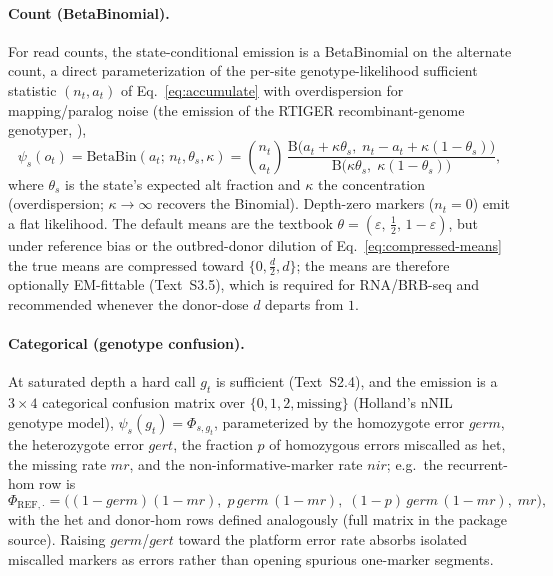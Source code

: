 \documentclass[11pt]{article}
\newcommand{\REF}{\mathrm{REF}}
\newcommand{\BetaBin}{\mathrm{BetaBin}}
\newcommand{\Bfun}{\mathrm{B}}                     %
\begin{document}
\paragraph{Count (BetaBinomial).} For read counts, the state-conditional emission is
a BetaBinomial on the alternate count, a direct parameterization of the per-site
genotype-likelihood sufficient statistic $(n_t,a_t)$ of Eq.~\eqref{eq:accumulate}
with overdispersion for mapping/paralog noise (the emission of the RTIGER
recombinant-genome genotyper, \citealp{rtiger_2023}),
\begin{equation}
\psi_s(o_t)=\BetaBin(a_t;\,n_t,\theta_s,\kappa)
=\binom{n_t}{a_t}\,
\frac{\Bfun\!\big(a_t+\kappa\theta_s,\;n_t-a_t+\kappa(1-\theta_s)\big)}{\Bfun\!\big(\kappa\theta_s,\;\kappa(1-\theta_s)\big)},
\label{eq:betabin}
\end{equation}
where $\theta_s$ is the state's expected alt fraction and $\kappa$ the concentration
(overdispersion; $\kappa\to\infty$ recovers the Binomial). Depth-zero markers
($n_t=0$) emit a flat likelihood. The default means are the textbook
$\theta=(\varepsilon,\,\tfrac12,\,1-\varepsilon)$, but under reference bias or the
outbred-donor dilution of Eq.~\eqref{eq:compressed-means} the true means are
compressed toward $\{0,\tfrac{d}{2},d\}$; the means are therefore optionally
EM-fittable (Text~S3.5), which is required for RNA/BRB-seq and recommended whenever
the donor-dose $d$ departs from $1$.

\paragraph{Categorical (genotype confusion).} At saturated depth a hard call
$g_t$ is sufficient (Text~S2.4), and the emission is a $3\times4$ categorical
confusion matrix over $\{0,1,2,\text{missing}\}$ (Holland's nNIL genotype model),
$\psi_s(g_t)=\Phi_{s,g_t}$, parameterized by the homozygote error $germ$, the
heterozygote error $gert$, the fraction $p$ of homozygous errors miscalled as het,
the missing rate $mr$, and the non-informative-marker rate $nir$; e.g.\ the
recurrent-hom row is
\begin{equation}
\Phi_{\REF,\cdot}=\big((1-germ)(1-mr),\;p\,germ\,(1-mr),\;(1-p)\,germ\,(1-mr),\;mr\big),
\label{eq:gtmat}
\end{equation}
with the het and donor-hom rows defined analogously (full matrix in the package
source). Raising $germ$/$gert$ toward the platform error rate absorbs isolated
miscalled markers as errors rather than opening spurious one-marker segments.
\end{document}
